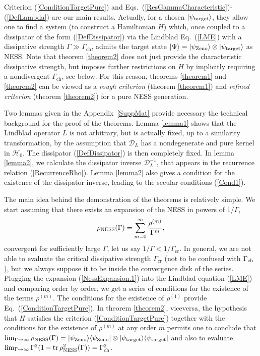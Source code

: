 \documentclass[aps,pra,letterpaper,twocolumn,showpacs,superscriptaddress,floatfix,longbibliography]{revtex4-1}
\newcommand{\tr}{\mathop{\mathrm{tr}}\limits}
\begin{document}
Criterion (\ref{ConditionTargetPure}) and
Eqs.~(\ref{ResGammaCharacteristic})-(\ref{DefLambda}) are our main
results. Actually, for a chosen $|{\psi_{\rm{target}}}\rangle$, they allow
one to find a system (to construct a Hamiltonian $H$) which, once
coupled to a dissipator of the form (\ref{DefDissipator}) via the
Lindblad Eq.~(\ref{LME}) with a dissipative strength $\Gamma \gg
\Gamma_\textrm{ch}$, admits the target state $|{\Psi }\rangle =
|{\psi_{\rm{Zeno}}}\rangle \otimes |{\psi_{\rm{target}}}\rangle$ as NESS.
Note that theorem \ref{theorem2} does not just provide the
characteristic dissipative strength, but imposes further restrictions
on $H$ by implicitly requiring a nondivergent $\Gamma_\textrm{ch}$,
see below.  For this reason, theorems \ref{theorem1} and
\ref{theorem2} can be viewed as a \textit{rough criterion} (theorem
\ref{theorem1}) and \textit{refined criterion} (theorem
\ref{theorem2}) for a pure NESS generation.

Two lemmas given in the Appendix~\ref{SuppMat} provide necessary the
technical background for the proof of the theorems. Lemma \ref{lemma1}
shows that the Lindblad operator $L$ is not arbitrary, but is actually
fixed, up to a similarity transformation, by the assumption that
$\mathcal{D}_L$ has a nondegenerate and pure kernel in
$\mathcal{H}_0$. The dissipator (\ref{DefDissipator}) is then
completely fixed.  In lemma \ref{lemma2}, we calculate the dissipator
inverse $\mathcal{D}_L^{-1}$, that appears in the recurrence relation
(\ref{RecurrenceRho}).  Lemma \ref{lemma2} also gives a condition for
the existence of the dissipator inverse, leading to the secular
conditions (\ref{Cond1}).

The main idea behind the demonstration of the theorems is relatively
simple.  We start assuming that there exists an expansion of the NESS
in powers of $1/\Gamma$,
\begin{align}
  \rho_{\rm{NESS}}(\Gamma) = \sum_{m=0}^\infty
  \frac{\rho^{(m)}}{\Gamma^m},
  \label{NessExpansion.1}
\end{align}
convergent for sufficiently large $\Gamma$, let us say
$1/\Gamma<1/\Gamma_\mathrm{cr}$. In general, we are not able to
evaluate the critical dissipative strength $\Gamma_\mathrm{cr}$ (not
to be confused with $\Gamma_{\rm{ch}}$), but we always suppose it to
be inside the convergence disk of the series.  Plugging the expansion
(\ref{NessExpansion.1}) into the Lindblad equation (\ref{LME}) and
comparing order by order, we get a series of conditions for the
existence of the terms $\rho^{(m)}$.  The conditions for the existence
of $\rho^{(1)}$ provide Eq.~(\ref{ConditionTargetPure}).  In theorem
\ref{theorem2}, viceversa, the hypothesis that $H$ satisfies the
criterion (\ref{ConditionTargetPure}) together with the conditions for
the existence of $\rho^{(m)}$ at any order $m$ permits one to conclude
that $\lim_{\Gamma\to\infty} \rho_{\rm{NESS}}(\Gamma) =
|{\psi_{\rm{Zeno}}}\rangle\langle{\psi_{\rm{Zeno}}}| \otimes
|{\psi_{\rm{target}}}\rangle\langle{\psi_{\rm{target}}}|$ and also to evaluate
$\lim_{\Gamma\to\infty} \Gamma^2 ( 1- \tr \rho^2_{\rm{NESS}}(\Gamma))
= \Gamma_{\rm{ch}}^2$.
\end{document}
